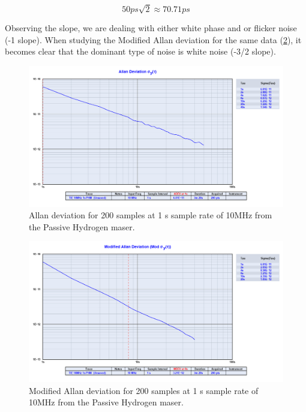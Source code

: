 \documentclass[11pt,english,a4paper]{article}
\begin{document}
\begin{displaymath}
 50 ps\sqrt{2}\approx 70.71 ps
\end{displaymath}

 Observing the slope, we are dealing with either white phase and or flicker noise (-1 slope). When studying the Modified Allan deviation for the same data (\ref{fig:mod_allan_dev1}), it becomes clear that the dominant type of noise is white noise (-3/2 slope).

\begin{figure}[]
  \centering
    \includegraphics[width=1\textwidth]{phm10mhz1s_allan.png}
  \caption{Allan deviation for 200 samples at 1 s sample rate of 10MHz from the Passive Hydrogen maser.}
      \label{fig:allan_dev1}
\end{figure}

\begin{figure}[]
  \centering
    \includegraphics[width=1\textwidth]{phm10mhz1s_modified_allan.png}
  \caption{Modified Allan deviation for 200 samples at 1 s sample rate of 10MHz from the Passive Hydrogen maser.}
      \label{fig:mod_allan_dev1}
\end{figure}
\end{document}
